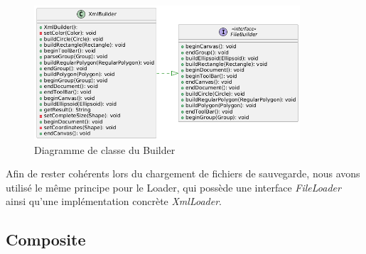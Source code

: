 \documentclass{article}
\begin{document}
\begin{figure}[h]
    \centering
    \includegraphics[width=\textwidth,height=5.0cm,keepaspectratio]{builder.png}
    \caption{Diagramme de classe du Builder}
    \label{Builder}
\end{figure}
\FloatBarrier

Afin de rester cohérents lors du chargement de fichiers de sauvegarde, nous avons utilisé le même principe pour le Loader,
qui possède une interface \textit{FileLoader} ainsi qu'une implémentation concrète \textit{XmlLoader}.

\subsection{Composite}
\end{document}
